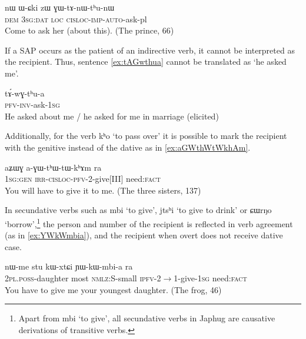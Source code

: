 \documentclass[oldfontcommands,oneside,a4paper,11pt]{article}
\newcommand{\ipa}[1]{{\phon #1}} %
\begin{document}
 \begin{exe}
   \ex   \label{ex:GWtAnWthunW}
 \gll
\ipa{nɯ}  	\ipa{ɯ-ɕki}  	\ipa{zɯ}  	\ipa{ɣɯ-tɤ-nɯ-tʰu-nɯ}  \\
\textsc{dem } \textsc{3sg:dat} \textsc{loc} \textsc{cisloc-imp-auto}-ask-pl \\
\glt Come to ask her (about this). (The prince, 66)
   \end{exe}  

If a  SAP occurs as the patient of an indirective verb, it cannot be interpreted as the recipient. Thus, sentence \ref{ex:tAGwthua} cannot be translated as `he asked me'.

 \begin{exe}
   \ex   \label{ex:tAGwthua}
 \gll
\ipa{tɤ́-wɣ-tʰu-a} \\
\textsc{pfv-inv}-ask-\textsc{1sg}\\
\glt He asked about me / he asked for me in marriage (elicited)   
      \end{exe}  
      
   Additionally, for the verb \ipa{kʰo} `to pass over' it is possible to mark the recipient with the genitive instead of the dative as in \ref{ex:aGWthWtWkhAm}.
 \begin{exe}
   \ex   \label{ex:aGWthWtWkhAm}
 \gll
\ipa{aʑɯɣ}  	\ipa{a-ɣɯ-tʰɯ-tɯ-kʰɤm}  	\ipa{ra}  \\
\textsc{1sg:gen} \textsc{irr-cisloc-pfv}-2-give[III] need:\textsc{fact} \\
\glt You will have to give it to me. (The three sisters, 137)
   \end{exe}  


In secundative verbs such as \ipa{mbi} `to give', \ipa{jtsʰi} `to give to drink' or \ipa{ɕɯrŋo} `borrow',\footnote{Apart from \ipa{mbi} `to give', all secundative verbs in Japhug are causative derivations of transitive verbs.} the person and number of the recipient is reflected in verb agreement (as in \ref{ex:YWkWmbia}), and the recipient when overt does not receive dative case.


 \begin{exe}
   \ex   \label{ex:YWkWmbia}
 \gll 
\ipa{nɯ-me}  	\ipa{stu}  	\ipa{kɯ-xtɕi}  	\ipa{ɲɯ-kɯ-mbi-a}  	\ipa{ra}  \\
\textsc{2pl.poss}-daughter most \textsc{nmlz}:S-small \textsc{ipfv}-2$\rightarrow$1-give-\textsc{1sg} need:\textsc{fact} \\
\glt You have to give me your youngest daughter.  (The frog, 46)
   \end{exe}  
\end{document}
